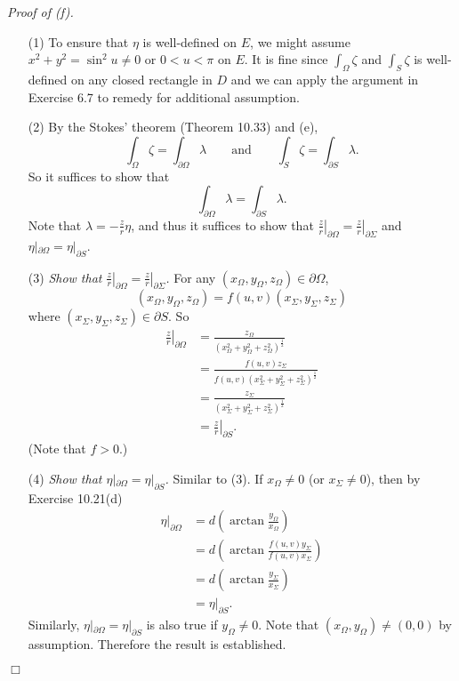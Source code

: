 \documentclass{article}
\begin{document}
\emph{Proof of (f).}
\begin{enumerate}
\item[(1)]
  To ensure that $\eta$ is well-defined on $E$,
  we might assume $x^2+y^2 = \sin^2 u \neq 0$ or $0 < u < \pi$ on $E$.
  It is fine since
  $\int_{\Omega} \zeta$ and $\int_{S} \zeta$ is well-defined on any closed rectangle in $D$
  and we can apply the argument in Exercise 6.7 to remedy for additional assumption.

\item[(2)]
  By the Stokes' theorem (Theorem 10.33) and (e),
  \[
    \int_{\Omega} \zeta = \int_{\partial\Omega} \lambda
    \qquad
    \text{and}
    \qquad
    \int_{S} \zeta = \int_{\partial S} \lambda.
  \]
  So it suffices to show that
  \[
    \int_{\partial\Omega} \lambda = \int_{\partial S} \lambda.
  \]
  Note that $\lambda = -\frac{z}{r} \eta$,
  and thus it suffices to show that
  $\left.\frac{z}{r}\right|_{\partial\Omega} = \left.\frac{z}{r}\right|_{\partial\Sigma}$
  and $\eta|_{\partial\Omega} = \eta|_{\partial S}$.

\item[(3)]
  \emph{Show that
  $\left.\frac{z}{r}\right|_{\partial\Omega} = \left.\frac{z}{r}\right|_{\partial\Sigma}$.}
  For any $(x_{\Omega}, y_{\Omega}, z_{\Omega}) \in \partial\Omega$,
  \[
    (x_{\Omega}, y_{\Omega}, z_{\Omega}) = f(u,v)(x_{\Sigma}, y_{\Sigma}, z_{\Sigma})
  \]
  where $(x_{\Sigma}, y_{\Sigma}, z_{\Sigma}) \in \partial S$.
  So
  \begin{align*}
    \left.\frac{z}{r}\right|_{\partial\Omega}
    &= \frac{z_{\Omega}}{(x_{\Omega}^2+y_{\Omega}^2+z_{\Omega}^2)^{\frac{1}{2}}} \\
    &= \frac{f(u,v)z_{\Sigma}}{f(u,v)(x_{\Sigma}^2+y_{\Sigma}^2+z_{\Sigma}^2)^{\frac{1}{2}}} \\
    &= \frac{z_{\Sigma}}{(x_{\Sigma}^2+y_{\Sigma}^2+z_{\Sigma}^2)^{\frac{1}{2}}} \\
    &= \left.\frac{z}{r}\right|_{\partial S}.
  \end{align*}
  (Note that $f > 0$.)

\item[(4)]
  \emph{Show that $\eta|_{\partial\Omega} = \eta|_{\partial S}$.}
  Similar to (3).
  If $x_{\Omega} \neq 0$ (or $x_{\Sigma} \neq 0$),
  then by Exercise 10.21(d)
  \begin{align*}
    \eta|_{\partial\Omega}
    &= d\left(\arctan\frac{y_{\Omega}}{x_{\Omega}}\right) \\
    &= d\left(\arctan\frac{f(u,v)y_{\Sigma}}{f(u,v)x_{\Sigma}}\right) \\
    &= d\left(\arctan\frac{y_{\Sigma}}{x_{\Sigma}}\right) \\
    &= \eta|_{\partial S}.
  \end{align*}
  Similarly, $\eta|_{\partial\Omega} = \eta|_{\partial S}$ is also true if $y_{\Omega} \neq 0$.
  Note that $(x_{\Omega},y_{\Omega}) \neq (0,0)$ by assumption.
  Therefore the result is established.
\end{enumerate}
$\Box$ \\
\end{document}
